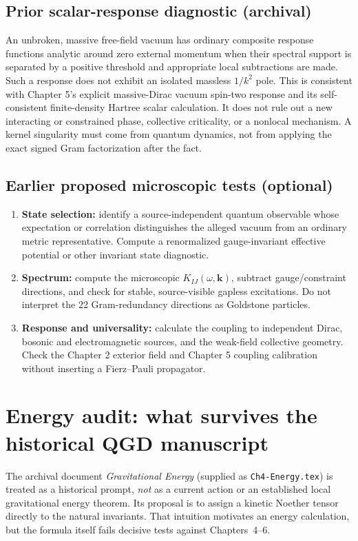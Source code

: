 \documentclass[11pt,a4paper]{article}
\theoremstyle{definition}\newtheorem{definition}[theorem]{Definition}
\theoremstyle{remark}\newtheorem{remark}[theorem]{Remark}
\begin{document}
\subsection{Prior scalar-response diagnostic (archival)}
An unbroken, massive free-field vacuum has ordinary composite response functions analytic around zero external momentum when their spectral support is separated by a positive threshold and appropriate local subtractions are made. Such a response does not exhibit an isolated massless $1/k^2$ pole. This is consistent with Chapter 5's explicit massive-Dirac vacuum spin-two response and its self-consistent finite-density Hartree scalar calculation. It does not rule out a new interacting or constrained phase, collective criticality, or a nonlocal mechanism. A kernel singularity must come from quantum dynamics, not from applying the exact signed Gram factorization after the fact.

\subsection{Earlier proposed microscopic tests (optional)}
\begin{enumerate}
\item \textbf{State selection:} identify a source-independent quantum observable whose expectation or correlation distinguishes the alleged vacuum from an ordinary metric representative. Compute a renormalized gauge-invariant effective potential or other invariant state diagnostic.
\item \textbf{Spectrum:} compute the microscopic $K_{IJ}(\omega,\bm k)$, subtract gauge/constraint directions, and check for stable, source-visible gapless excitations. Do not interpret the 22 Gram-redundancy directions as Goldstone particles.
\item \textbf{Response and universality:} calculate the coupling to independent Dirac, bosonic and electromagnetic sources, and the weak-field collective geometry. Check the Chapter 2 exterior field and Chapter 5 coupling calibration without inserting a Fierz--Pauli propagator.
\end{enumerate}

\section{Energy audit: what survives the historical QGD manuscript}
\label{sec:historical-energy}
The archival document \emph{Gravitational Energy} (supplied as \texttt{Ch4-Energy.tex}) is treated as a historical prompt, \emph{not} as a current action or an established local gravitational energy theorem. Its proposal is to assign a kinetic Noether tensor directly to the natural invariants. That intuition motivates an energy calculation, but the formula itself fails decisive tests against Chapters~4--6.
\end{document}
